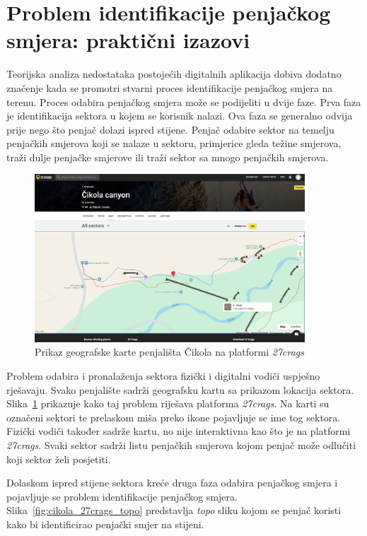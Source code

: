 \section{Problem identifikacije penjačkog smjera: praktični izazovi}

Teorijska analiza nedostataka postojećih digitalnih aplikacija dobiva dodatno značenje kada se promotri stvarni proces identifikacije penjačkog smjera na terenu. Proces odabira penjačkog smjera može se podijeliti u dvije faze. Prva faza je identifikacija sektora u kojem se korisnik nalazi. Ova faza se generalno odvija prije nego što penjač dolazi ispred stijene. Penjač odabire sektor na temelju penjačkih smjerova koji se nalaze u sektoru, primjerice gleda težine smjerova, traži dulje penjačke smjerove ili traži sektor sa mnogo penjačkih smjerova.
\begin{figure}[H]
    \centering
    \includegraphics[width=0.9\textwidth]{images/analiza/cikola_27crags_map.jpeg}
    \caption{Prikaz geografske karte penjališta Čikola na platformi \textit{27crags}}
    \label{fig:cikola_27crags_map}
\end{figure} 
Problem odabira i pronalaženja sektora fizički i digitalni vodiči uspješno rješavaju. Svako penjalište sadrži geografsku kartu sa prikazom lokacija sektora. Slika~\ref{fig:cikola_27crags_map} prikazuje kako taj problem riješava platforma \textit{27crags}. Na karti su označeni sektori te prelaskom miša preko ikone pojavljuje se ime tog sektora. Fizički vodiči također sadrže kartu, no nije interaktivna kao što je na platformi \textit{27crags}. Svaki sektor sadrži listu penjačkih smjerova kojom penjač može odlučiti koji sektor želi posjetiti.

Dolaskom ispred stijene sektora kreće druga faza odabira penjačkog smjera i pojavljuje se problem identifikacije penjačkog smjera. Slika~\ref{fig:cikola_27crags_topo} predstavlja \textit{topo} sliku kojom se penjač koristi kako bi identificirao penjački smjer na stijeni.

